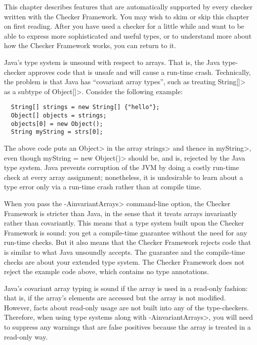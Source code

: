 \htmlhr
{}

This chapter describes features that are automatically supported by every
checker written with the Checker Framework.
You may wish to skim or skip this chapter on first reading.  After you have
used a checker for a little while and want to be able to express more
sophisticated and useful types, or to understand more about how the Checker
Framework works, you can return to it.



Java's type system is unsound with respect to arrays.  That is, the Java
type-checker approves code that is unsafe and will cause a run-time crash.
Technically, the problem is that Java has ``covariant array types'', such
as treating \<String[]> as a subtype of \<Object[]>.  Consider the
following example:

\begin{Verbatim}
  String[] strings = new String[] {"hello"};
  Object[] objects = strings;
  objects[0] = new Object();
  String myString = strs[0];
\end{Verbatim}

\noindent
The above code puts an \<Object> in the array \<strings> and thence in
\<myString>, even though \<myString = new Object()> should be, and is,
rejected by the Java type system.  Java prevents corruption of the JVM by
doing a costly run-time check at every array assignment; nonetheless, it is
undesirable to learn about a type error only via a run-time crash rather
than at compile time.

When you pass the \<-AinvariantArrays> command-line option,
the Checker Framework is stricter than Java, in the sense that it treats
arrays invariantly rather than covariantly.  This means that a type system
built upon the Checker Framework is sound:  you get a compile-time
guarantee without the need for any run-time checks.  But it also means that
the Checker Framework rejects code that is similar to what Java unsoundly
accepts.  The guarantee and the compile-time checks are about your
extended type system.  The Checker Framework does not reject the example
code above, which contains no type annotations.

Java's covariant array typing is sound if the array is used in a read-only
fashion:  that is, if the array's elements are accessed but the array is
not modified.  However, facts about read-only usage are not built into any of
the type-checkers.  Therefore, when using type systems
along with \<-AinvariantArrays>, you will need to suppress any warnings that
are false positives because the array is treated in a read-only way.


